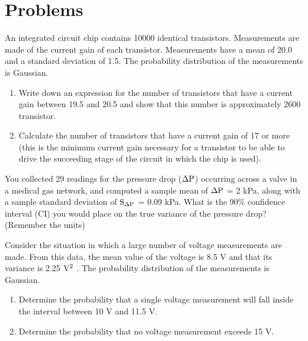 \documentclass[a4paper,11pt,dvipsnames]{book}
\begin{document}
\onecolumn

\chapter*{Problems}


\begin{question}
An integrated circuit chip contains 10000 identical transistors. Measurements are made of the current gain of each transistor. Measurements have a mean of 20.0 and a standard deviation of 1.5. The probability distribution of the measurements is
Gaussian.

\begin{enumerate}
\item Write down an expression for the number of transistors that have a current gain between 19.5 and 20.5 and show that this number is approximately 2600 transistor.
\item Calculate the number of transistors that have a current gain of 17 or more (this is the minimum current gain necessary for a transistor to be able to drive the succeeding stage of the circuit in which the chip is used).
\end{enumerate}
\examspace*{10em}

\end{question}
\begin{solution}


\end{solution}


\begin{question}
You collected 29 readings for the pressure drop ($\rm \Delta P$) occurring across a valve in a medical gas network, and computed a sample mean of $\rm \Delta P$ = 2 kPa, along with a
sample standard deviation of $\rm S_{\Delta P}$ = 0.09 kPa. What is the 90\% confidence interval (CI) you would place on the true variance of the pressure drop? (Remember the units)

\examspace*{10em}

\end{question}
\begin{solution}


\end{solution}


\begin{question}
Consider the situation in which a large number of voltage measurements are made. From this data, the mean value of the voltage is 8.5 V and that its variance is 2.25 $\rm V^2$ . The probability distribution of the
measurements is Gaussian.

\begin{enumerate}
\item Determine the probability that a single voltage measurement will fall inside the interval between 10 V and 11.5 V.
\item Determine the probability that no voltage measurement exceeds 15 V.
\end{enumerate}

\examspace*{10em}

\end{question}
\begin{solution}


\end{solution}
\end{document}
